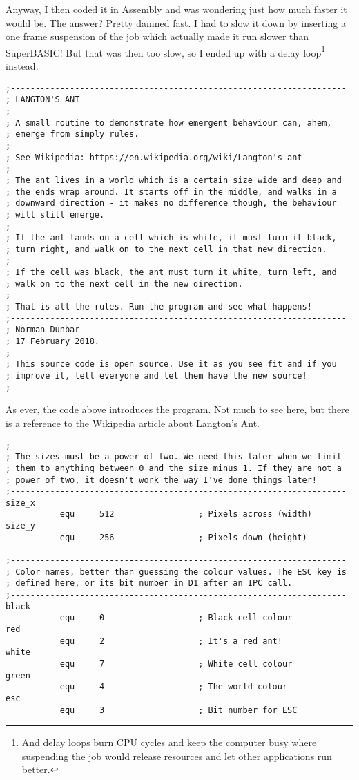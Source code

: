 Anyway, I then coded it in Assembly and was wondering just how much faster it would be. The answer? Pretty damned fast. I had to slow it down by inserting a one frame suspension of the job which actually made it run slower than SuperBASIC! But that was then too slow, so I ended up with a delay loop\footnote{And delay loops burn CPU cycles and keep the computer busy where suspending the job would release resources and let other applications run better.} instead.

\begin{lstlisting}[firstnumber=1,caption={Langtons Ant - Opening Blurb}]
;--------------------------------------------------------------------
; LANGTON'S ANT
;
; A small routine to demonstrate how emergent behaviour can, ahem,
; emerge from simply rules.
;
; See Wikipedia: https://en.wikipedia.org/wiki/Langton's_ant
;
; The ant lives in a world which is a certain size wide and deep and
; the ends wrap around. It starts off in the middle, and walks in a
; downward direction - it makes no difference though, the behaviour
; will still emerge.
;
; If the ant lands on a cell which is white, it must turn it black,
; turn right, and walk on to the next cell in that new direction.
;
; If the cell was black, the ant must turn it white, turn left, and
; walk on to the next cell in the new direction.
;
; That is all the rules. Run the program and see what happens!
;--------------------------------------------------------------------
; Norman Dunbar
; 17 February 2018.
;
; This source code is open source. Use it as you see fit and if you
; improve it, tell everyone and let them have the new source!
;--------------------------------------------------------------------
\end{lstlisting}

As ever, the code above introduces the program. Not much to see here, but there is a reference to the Wikipedia article about Langton's Ant.

\begin{lstlisting}[firstnumber=last,caption={Langtons Ant - Equates}]
;--------------------------------------------------------------------
; The sizes must be a power of two. We need this later when we limit
; them to anything between 0 and the size minus 1. If they are not a
; power of two, it doesn't work the way I've done things later!
;--------------------------------------------------------------------
size_x
           equ     512                 ; Pixels across (width)
size_y
           equ     256                 ; Pixels down (height)

;--------------------------------------------------------------------
; Color names, better than guessing the colour values. The ESC key is
; defined here, or its bit number in D1 after an IPC call.
;--------------------------------------------------------------------
black
           equ     0                   ; Black cell colour
red
           equ     2                   ; It's a red ant!
white
           equ     7                   ; White cell colour
green
           equ     4                   ; The world colour
esc
           equ     3                   ; Bit number for ESC
\end{lstlisting}

